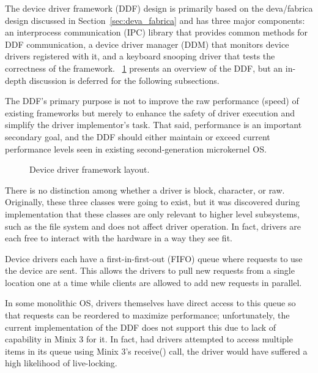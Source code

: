 \label{sec:design}

The {\important device driver framework} (DDF) design is primarily
based on the deva/fabrica design discussed in Section~\ref{sec:deva_fabrica}
and has three major components: an interprocess communication (IPC)
library that provides common methods for DDF communication, a
{\important device driver manager} (DDM) that monitors device drivers
registered with it, and a keyboard snooping driver that tests the correctness
of the framework.  \figurename~\ref{fig:ddf_layout} presents an overview of
the DDF, but an in-depth discussion is deferred for the following subsections.

The DDF's primary purpose is not to improve the raw performance (speed) of
existing frameworks but merely to enhance the safety of driver execution and
simplify the driver implementor's task.  That said, performance is an
important secondary goal, and the DDF should either maintain or exceed current
performance levels seen in existing second-generation microkernel OS.

	\begin{figure}[tbp]
	\begin{center}
	\end{center}
	\caption{Device driver framework layout.}
	\label{fig:ddf_layout}
	\end{figure}


There is no distinction among whether a driver is block, character, or raw.
Originally, these three classes were going to exist, but it was discovered
during implementation that these classes are only relevant to higher level
subsystems, such as the file system and does not affect driver operation.
In fact, drivers are each free to interact with the hardware in a way
they see fit.


Device drivers each have a first-in-first-out (FIFO) queue where requests to
use the device are sent.  This allows the drivers to pull new requests from
a single location one at a time while clients are allowed to add new
requests in parallel.

In some monolithic OS, drivers themselves have direct
access to this queue so that requests can be reordered to maximize performance;
unfortunately, the current implementation of the DDF does not support this due
to lack of capability in Minix 3 for it.  In fact, had drivers attempted
to access multiple items in its queue using Minix 3's {\code receive()} call,
the driver would have suffered a high likelihood of live-locking.

